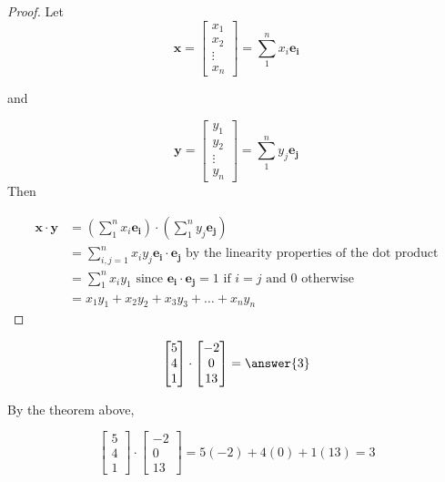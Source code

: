 \documentclass{ximera}
\begin{document}
\begin{proof}
	Let 
	\[ 
	\mathbf{x} = \begin{bmatrix}x_1\\x_2\\\vdots\\x_n\end{bmatrix} = \sum_1^n x_i \mathbf{e_i}
	\]
	
	 and
	 
	\[ 
	\mathbf{y} = \begin{bmatrix}y_1\\y_2\\\vdots\\y_n\end{bmatrix} = \sum_1^n y_j \mathbf{e_j}
	\]	 
	 Then
	 
	\begin{align*}
		\mathbf{x} \cdot \mathbf{y} &= (\sum_1^n x_i \mathbf{e_i}) \cdot (\sum_1^n y_j \mathbf{e_j})\\
			&=\sum_{i,j =1}^n x_iy_j \mathbf{e_i} \cdot \mathbf{e_j} \textrm{ by the linearity properties of the dot product}\\
			&=\sum_{1}^n x_iy_1 \textrm{ since $\mathbf{e_i} \cdot \mathbf{e_j} = 1$ if $i=j$ and $0$ otherwise}\\
			&=x_1y_1+x_2y_2+x_3y_3+\dots + x_ny_n
	\end{align*}
\end{proof}

\begin{question}
	\[
	\begin{bmatrix} 5 \\ 4 \\ 1 \end{bmatrix} \cdot \begin{bmatrix}-2 \\ 0 \\  13\end{bmatrix} = \answer{3} 
	\]
	\begin{hint}
		By the theorem above, 
		
		\[
		\begin{bmatrix} 5 \\ 4 \\ 1 \end{bmatrix} \cdot \begin{bmatrix}-2 \\ 0 \\  13\end{bmatrix} = 5(-2)+4(0)+1(13) = 3
		\]
	\end{hint}
\end{question}
\end{document}
